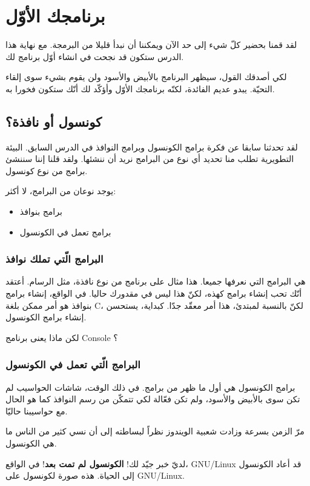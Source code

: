 \chapter{برنامجك الأوّل}
لقد قمنا بحضير كلّ شيء إلى حد الآن ويمكننا أن نبدأ قليلا من البرمجة. مع نهاية هذا الدرس ستكون قد نجحت في انشاء أوّل برنامج لك.

لكي أصدقك القول، سيظهر البرنامج بالأبيض والأسود ولن يقوم بشيء سوى إلقاء التحيّة. يبدو عديم الفائدة، لكنّه برنامجك الأوّل وأؤكّد لك أنّك ستكون فخورا به.

\section{كونسول أو نافذة؟}
لقد تحدثنا سابقا عن فكرة برامج الكونسول وبرامج النوافذ في الدرس السابق. البيئة التطويرية تطلب منا تحديد أي نوع من البرامج نريد أن ننشئها. ولقد قلنا إننا سننشئ برامج من نوع كونسول.

يوجد نوعان من البرامج، لا أكثر:
\begin{itemize}
  \item برامج بنوافذ
  \item برامج تعمل في الكونسول
\end{itemize}

\subsection{البرامج الّتي تملك نوافذ}
هي البرامج التي نعرفها جميعا. هذا مثال على برنامج من نوع نافذة، مثل الرسام.
أعتقد أنّك تحب إنشاء برامج كهذه، لكنّ هذا ليس في مقدورك حاليا. في الواقع، إنشاء برامج بنوافذ هو أمر ممكن بلغة \textenglish{C}، لكنّ بالنسبة لمبتدئ، هذا أمر معقّد جدّا. كبداية، يستحسن إنشاء برامج الكونسول.

\begin{question}
  لكن ماذا يعنى برنامج
\textenglish{Console}
؟
\end{question}

\subsection{البرامج الّتي تعمل في الكونسول}
برامج الكونسول هي أول ما ظهر من برامج. في ذلك الوقت، شاشات الحواسيب لم تكن سوى بالأبيض والأسود، ولم تكن فعّالة لكي تتمكّن من رسم النوافذ كما هو الحال مع حواسيبنا حاليّا.

مرّ الزمن بسرعة وزادت شعبية الويندوز نظراً لبساطته إلى أن نسي كثير من الناس ما هي الكونسول.

لديّ خبر جيّد لك!
\textbf{الكونسول لم تمت بعد}!
 في الواقع،
\textenglish{GNU/Linux}
 قد أعاد الكونسول إلى الحياة. هذه صورة لكونسول على
\textenglish{GNU/Linux}.

